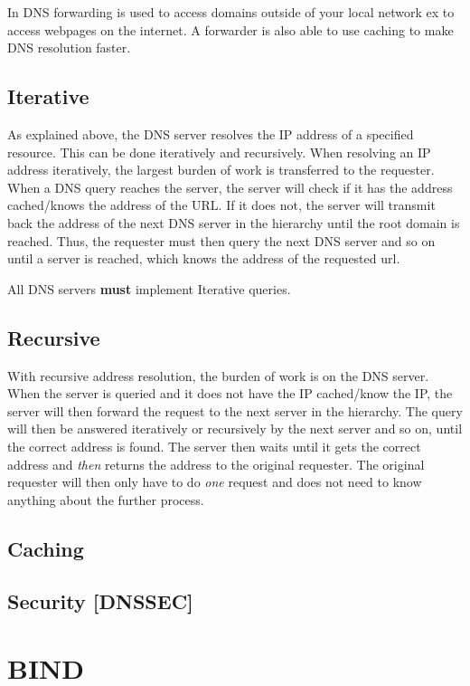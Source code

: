 In DNS forwarding is used to access domains outside of your local network ex to access webpages on the internet. A forwarder is also able to use caching to make DNS resolution faster.
\subsection{Iterative}
As explained above, the DNS server resolves the IP address of a specified resource. This can be done iteratively and recursively.
When resolving an IP address iteratively, the largest burden of work is transferred to the requester. 
When a DNS query reaches the server, the server will check if it has the address cached/knows the address of the URL. If it does not, the server will transmit back the address of the next DNS server in the hierarchy until the root domain is reached.
Thus, the requester must then query the next DNS server and so on until a server is reached, which knows the address of the requested url.

All DNS servers \textbf{must} implement Iterative queries.

\subsection{Recursive}
With recursive address resolution, the burden of work is on the DNS server. When the server is queried and it does not have the IP cached/know the IP, the server will then forward the request to the next server in the hierarchy. The query will then be answered iteratively or recursively by the next server and so on, until the correct address is found.
The server then waits until it gets the correct address and \textit{then} returns the address to the original requester. The original requester will then only have to do \textit{one} request and does not need to know anything about the further process. 

\subsection{Caching}

\subsection{Security [DNSSEC]}
\section{BIND}
